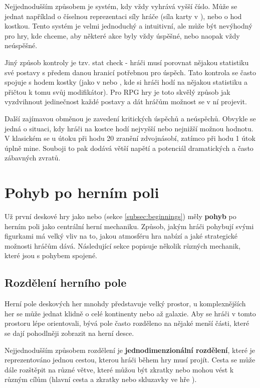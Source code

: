 Nejjednodušším způsobem je systém, kdy vždy vyhrává vyšší číslo. Může se jednat například o číselnou reprezentaci síly hráče (síla karty v ), nebo o hod kostkou. Tento systém je velmi jednoduchý a intuitivní, ale může být nevýhodný pro hry, kde chceme, aby některé akce byly vždy úspěšné, nebo naopak vždy neúspěšné.

Jiný způsob kontroly je tzv. stat check - hráči musí porovnat nějakou statistiku své postavy s předem danou hranicí potřebnou pro úspěch. Tato kontrola se často spojuje s hodem kostky (jako v  nebo , kde si hráči hodí na nějakou statistiku a přičtou k tomu svůj modifikátor). Pro RPG hry je toto skvělý způsob jak vyzdvihnout jedinečnost každé postavy a dát hráčům možnost se v ní projevit.

Další zajímavou obměnou je zavedení kritických úspěchů a neúspěchů. Obvykle se jedná o situaci, kdy hráči na kostce hodí nejvyšší nebo nejnižší možnou hodnotu. V klasickém  se u útoku při hodu 20 zranění zdvojnásobí, zatímco při hodu 1 útok úplně mine. Souboji to pak dodává větší napětí a potenciál dramatických a často zábavných zvratů.



\section{Pohyb po herním poli}
\label{sec:movement}

Už první deskové hry jako  nebo  (sekce \ref{subsec:beginnings}) měly \textbf{pohyb} po herním poli jako centrální herní mechaniku. Způsob, jakým hráči pohybují svými figurkami má velký vliv na to, jakou atmosféru hra nabízí a jaké strategické možnosti hráčům dává. Následující sekce popisuje několik různých mechanik, které jsou s pohybem spojené.

\subsection{Rozdělení herního pole}
\label{subsec:movement_tessellation}

Herní pole deskových her mnohdy představuje velký prostor, u komplexnějších her se může jednat klidně o celé kontinenty nebo až galaxie. Aby se hráči v tomto prostoru lépe orientovali, bývá pole často rozděleno na nějaké menší části, které se dají pohodlněji zobrazit na herní desce.

Nejjednodušším způsobem rozdělení je \textbf{jednodimenzionální rozdělení}, které je reprezentováno jednou cestou, kterou hráči během hry musí projít. Cesta se může dále rozštěpit na různé větve, které můžou být zkratky nebo mohou vést k různým cílům (hlavní cesta a zkratky nebo skluzavky ve hře ).


